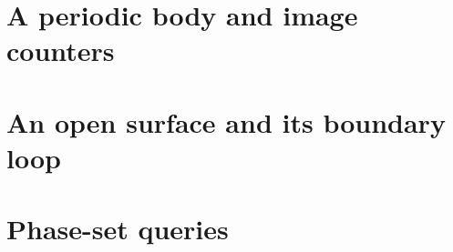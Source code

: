 

\section{A periodic body and image counters}
\label{sec:ex-periodic}



\section{An open surface and its boundary loop}
\label{sec:ex-open}



\section{Phase-set queries}
\label{sec:ex-phaseset}


